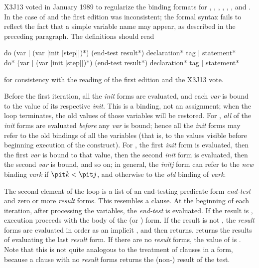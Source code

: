 \begin{defmac}
\begin{new}
X3J13 voted in January 1989
to regularize the binding formats for , , ,
, , , and .
In the case of  and  the first edition was inconsistent;
the formal syntax fails to reflect the fact that a simple variable
name may appear, as described in the preceding paragraph.  The
definitions should read

\begin{defmac}
do ({var | (var [init [step]])}*)
   (end-test {result}*)
   {declaration}* {tag | statement}* \\
do* ({var | (var [init [step]])}*)
    (end-test {result}*)
    {declaration}* {tag | statement}*

for consistency with the reading of the first edition and the X3J13 vote.
\end{defmac}
\end{new}

Before the first iteration, all the {\it init} forms are evaluated, and
each {\it var} is bound to the value of its respective {\it init}.
This is a binding, not an assignment; when the loop terminates,
the old values of those variables will be restored.
For , {\it all} of the {\it init} forms are evaluated {\it before} any {\it var}
is bound; hence all the
{\it init} forms may refer to the old bindings of all the variables
(that is, to the values visible before beginning execution of
the  construct).
For , the first {\it init} form is evaluated, then the first
{\it var} is bound to that value, then the second {\it init} form
is evaluated, then the second {\it var} is bound, and so on;
in general, the {\it initj} form can refer to the {\it new} binding {\it vark}
if ${\it k\/}<{\it j}$, and otherwise to the {\it old} binding of {\it vark}.

The second element of the loop is a list of an end-testing
predicate form {\it end-test} and zero or more {\it result} forms.
This resembles a  clause.
At the beginning of each iteration, after processing the variables,
the {\it end-test} is evaluated.  If the result is
{\false}, execution proceeds with the body of the  (or ) form.
If the
result is not {\false}, the {\it result} forms are evaluated in order
as an implicit ,
and then  returns.   returns the results of evaluating
the last {\it result} form.
If there are no {\it result} forms, the value of  is {\false}.
Note that this is not quite analogous to the treatment of
clauses in a  form, because a  clause
with no {\it result} forms returns the (non-{\nil}) result of the test.


\end{defmac}
